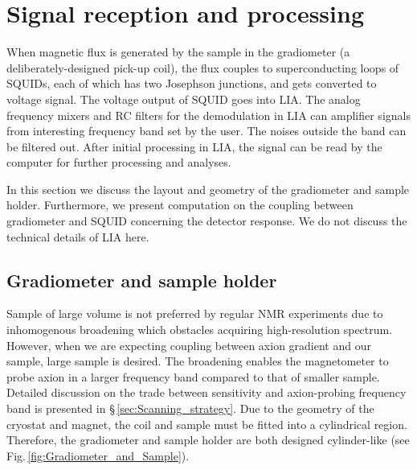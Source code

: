 \section{Signal reception and processing}\label{sec:Signal_receptio_and_processing}

When magnetic flux is generated by the sample in the gradiometer (a deliberately-designed pick-up coil), the flux couples to superconducting loops of SQUIDs, each of which has two Josephson junctions, and gets converted to voltage signal. The voltage output of SQUID goes into LIA. The analog frequency mixers and RC filters for the demodulation in LIA can amplifier signals from interesting frequency band set by the user. The noises outside the band can be filtered out. 
After initial processing in LIA, the signal can be read by the computer for further processing and analyses. 

In this section we discuss the layout and geometry of the gradiometer and sample holder. Furthermore, we present computation on the coupling between gradiometer and SQUID concerning the detector response. We do not discuss the technical details of LIA here. 

\subsection{Gradiometer and sample holder}\label{sec:Signal_receptio_and_processing:Gradiometer_and_sample_holder}

Sample of large volume is not preferred by regular NMR experiments due to inhomogenous broadening which obstacles acquiring high-resolution spectrum. However, when we are expecting coupling between axion gradient and our sample, large sample is desired. The broadening enables the magnetometer to probe axion in a larger frequency band compared to that of smaller sample. Detailed discussion on the trade between sensitivity and axion-probing frequency band is presented in \S\,\ref{sec:Scanning_strategy}. 
Due to the geometry of the cryostat and magnet, the coil and sample must be fitted into a cylindrical region. Therefore, the gradiometer and sample holder are both designed cylinder-like (see Fig.\,\ref{fig:Gradiometer_and_Sample}). 

